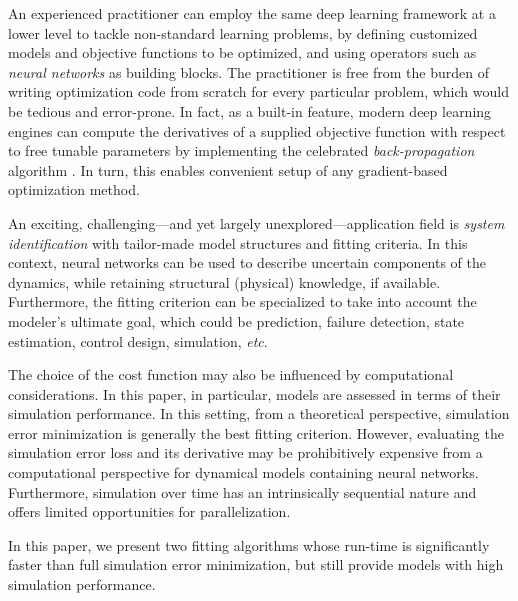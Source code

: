 \documentclass{article} %
\begin{document}
 
An experienced practitioner can employ the same deep learning framework at a lower level to tackle non-standard learning problems, by defining customized models and objective functions to be optimized, and using operators such as \emph{neural networks} as building blocks. 
The practitioner is free from the burden of writing optimization code from scratch for every particular problem, which would be tedious and error-prone.
In fact, as a built-in feature, modern deep learning engines can compute the derivatives of a supplied objective function with respect to free tunable parameters by implementing the celebrated \emph{back-propagation} algorithm \citep{rumelhart1988learning}. In turn, this enables convenient setup of any gradient-based optimization method.

An exciting, challenging---and yet largely unexplored---application field is \emph{system identification} with tailor-made model structures and fitting criteria. In this context, neural networks can be used to describe uncertain components of the  dynamics, while retaining structural (physical) knowledge, if available. Furthermore, the fitting criterion can be specialized to take into account the modeler's ultimate goal, which could be prediction, failure detection, state estimation, control design, simulation, \emph{etc}.  

The choice of the cost function may also be influenced by computational considerations. 
In this paper, in particular, models are assessed in terms of their simulation performance. In this setting, from a theoretical perspective, simulation error minimization is generally the best fitting criterion. However, evaluating the simulation error loss and its derivative may be prohibitively expensive from a computational perspective for dynamical models containing neural networks. Furthermore, simulation over time has an intrinsically sequential nature and offers limited opportunities for parallelization.

In this paper, we present two fitting algorithms 
whose run-time is significantly faster than full simulation error minimization, but still provide models with high simulation performance. 
\end{document}
